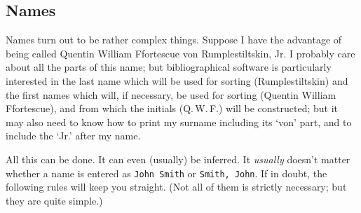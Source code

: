 {\subsection{Names}

Names turn out to be rather complex things. Suppose I have the
advantage of being called Quentin William Ffortescue von
Rumplestiltskin, Jr. I probably care about all the parts of this name;
but bibliographical software is particularly interested in the last
name which will be used for sorting (Rumplestiltskin) and the first
names which will, if necessary, be used for sorting (Quentin William
Ffortescue), and from which the initials (Q.\,W.\,F.) will be
constructed; but it may also need to know how to print my surname
including its `von' part, and to include the `Jr.' after my name.

All this can be done. It can even (usually) be inferred. It
\emph{usually} doesn't matter whether a name is entered as
\verb|John Smith| or \verb|Smith, John|. If in doubt, the following
rules will keep you straight. (Not all of them is strictly necessary;
but they are quite simple.)

}
